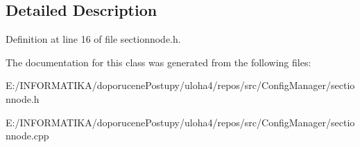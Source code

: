\subsection{Detailed Description}


Definition at line 16 of file sectionnode.\+h.



The documentation for this class was generated from the following files\+:\begin{DoxyCompactItemize}
\item 
E\+:/\+I\+N\+F\+O\+R\+M\+A\+T\+I\+K\+A/doporucene\+Postupy/uloha4/repos/src/\+Config\+Manager/sectionnode.\+h\item 
E\+:/\+I\+N\+F\+O\+R\+M\+A\+T\+I\+K\+A/doporucene\+Postupy/uloha4/repos/src/\+Config\+Manager/sectionnode.\+cpp\end{DoxyCompactItemize}

